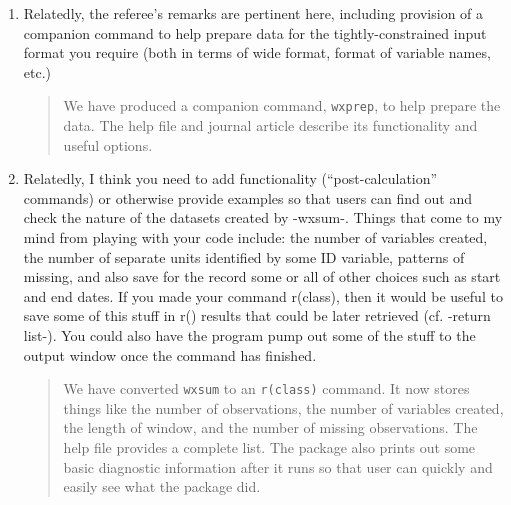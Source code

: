 \documentclass{article}[11pt]
\begin{document}
\begin{enumerate}
\begin{quote}
        In terms of using composite metrics as \textbf{inputs} to \texttt{wxsum}, this is already possible. The package is agnostic to what the input data actually is and what the unit of measure is. There is nothing to stop a user running \texttt{wxsum} on composite metrics. In these cases, not all output statistics will be meaningful but the user can drop those. In the help file we now mention the ability use of other types of data with the package.
    \end{quote}

    \item Relatedly, the referee's remarks are pertinent here, including provision of a companion command to help prepare data for the tightly-constrained input format you require (both in terms of wide format, format of variable names, etc.)
    \begin{quote}
        We have produced a companion command, \texttt{wxprep}, to help prepare the data. The help file and journal article describe its functionality and useful options.
    \end{quote}

    \item Relatedly, I think you need to add functionality (``post-calculation'' commands) or otherwise provide examples so that users can find out and check the nature of the datasets created by -wxsum-. Things that come to my mind from playing with your code include: the number of variables created, the number of separate units identified by some ID variable, patterns of missing, and also save for the record some or all of other choices such as start and end dates. If you made your command r(class), then it would be useful to save some of this stuff in r() results that could be later retrieved (cf. -return list-). You could also have the program pump out some of the stuff to the output window once the command has finished.
    \begin{quote}
        We have converted \texttt{wxsum} to an \texttt{r(class)} command. It now stores things like the number of observations, the number of variables created, the length of window, and the number of missing observations. The help file provides a complete list. The package also prints out some basic diagnostic information after it runs so that user can quickly and easily see what the package did.
    \end{quote}


\end{enumerate}
\end{document}
